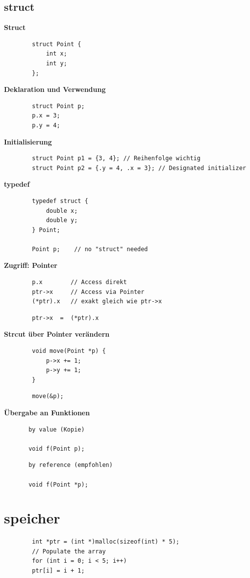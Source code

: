 \documentclass[a4paper,9pt]{article}
\begin{document}
    \subsection{struct}
             \textbf{Struct}
    \begin{lstlisting}
        struct Point {
            int x;
            int y;
        };
    \end{lstlisting}
    \textbf{Deklaration und Verwendung}
    \begin{lstlisting}
        struct Point p;
        p.x = 3;
        p.y = 4;
    \end{lstlisting}
    \textbf{Initialisierung}
    \begin{lstlisting}
        struct Point p1 = {3, 4}; // Reihenfolge wichtig
        struct Point p2 = {.y = 4, .x = 3}; // Designated initializer
    \end{lstlisting}
    \textbf{typedef}
    \begin{lstlisting}
        typedef struct {
            double x;
            double y;
        } Point;
        
        Point p;    // no "struct" needed
    \end{lstlisting}
    \textbf{Zugriff: Pointer}
    \begin{lstlisting}
        p.x        // Access direkt
        ptr->x     // Access via Pointer
        (*ptr).x   // exakt gleich wie ptr->x
    \end{lstlisting}
    \begin{lstlisting}
        ptr->x  =  (*ptr).x
    \end{lstlisting}
        \textbf{Strcut über Pointer verändern}
    \begin{lstlisting}
        void move(Point *p) {
            p->x += 1;
            p->y += 1;
        }
    \end{lstlisting}
    \begin{lstlisting}
        move(&p);
    \end{lstlisting}
   \textbf{Übergabe an Funktionen}
   \begin{lstlisting}
       by value (Kopie)
       
       void f(Point p);
   \end{lstlisting}
   \begin{lstlisting}
       by reference (empfohlen)
       
       void f(Point *p);
   \end{lstlisting}
   
   \section{speicher}
    \begin{lstlisting}
        int *ptr = (int *)malloc(sizeof(int) * 5);
        // Populate the array
        for (int i = 0; i < 5; i++)
        ptr[i] = i + 1;
    \end{lstlisting}
    
\end{document}
